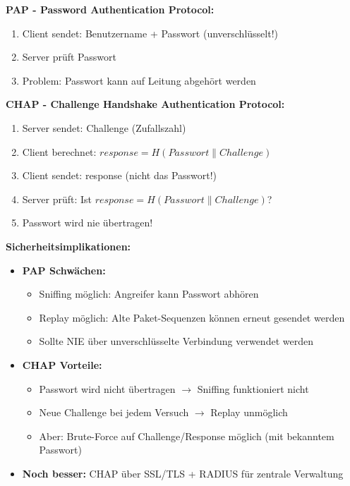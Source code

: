 \documentclass[12pt,a4paper]{article}
\begin{document}
\begin{tcolorbox}[colback=solutionbg, colframe=black!30]

\textbf{PAP - Password Authentication Protocol:}

\begin{enumerate}[1.]
    \item Client sendet: Benutzername + Passwort (unverschlüsselt!)
    \item Server prüft Passwort
    \item Problem: Passwort kann auf Leitung abgehört werden
\end{enumerate}

\textbf{CHAP - Challenge Handshake Authentication Protocol:}

\begin{enumerate}[1.]
    \item Server sendet: Challenge (Zufallszahl) 
    \item Client berechnet: $response = H(Passwort \| Challenge)$
    \item Client sendet: response (nicht das Passwort!)
    \item Server prüft: Ist $response = H(Passwort \| Challenge)$?
    \item Passwort wird nie übertragen!
\end{enumerate}

\textbf{Sicherheitsimplikationen:} \checkmark

\begin{itemize}
    \item \textbf{PAP Schwächen:}
    \begin{itemize}
        \item Sniffing möglich: Angreifer kann Passwort abhören
        \item Replay möglich: Alte Paket-Sequenzen können erneut gesendet werden
        \item Sollte NIE über unverschlüsselte Verbindung verwendet werden
    \end{itemize}
    
    \item \textbf{CHAP Vorteile:}
    \begin{itemize}
        \item Passwort wird nicht übertragen $\to$ Sniffing funktioniert nicht
        \item Neue Challenge bei jedem Versuch $\to$ Replay unmöglich
        \item Aber: Brute-Force auf Challenge/Response möglich (mit bekanntem Passwort)
    \end{itemize}
    
    \item \textbf{Noch besser:} CHAP über SSL/TLS + RADIUS für zentrale Verwaltung
\end{itemize}

\end{tcolorbox}
\end{document}
